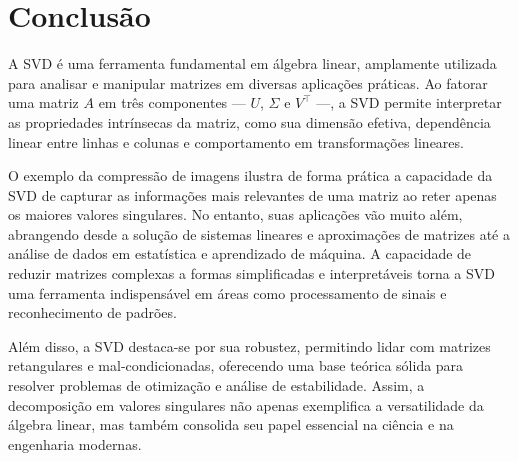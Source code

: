 \chapter{Conclusão}

A SVD é uma ferramenta fundamental em álgebra linear, amplamente utilizada para analisar e manipular matrizes em diversas aplicações práticas. Ao fatorar uma matriz \( A \) em três componentes — \( U \), \( \Sigma \) e \( V^\top \) —, a SVD permite interpretar as propriedades intrínsecas da matriz, como sua dimensão efetiva, dependência linear entre linhas e colunas e comportamento em transformações lineares. 

O exemplo da compressão de imagens ilustra de forma prática a capacidade da SVD de capturar as informações mais relevantes de uma matriz ao reter apenas os maiores valores singulares. No entanto, suas aplicações vão muito além, abrangendo desde a solução de sistemas lineares e aproximações de matrizes até a análise de dados em estatística e aprendizado de máquina. A capacidade de reduzir matrizes complexas a formas simplificadas e interpretáveis torna a SVD uma ferramenta indispensável em áreas como processamento de sinais e reconhecimento de padrões.

Além disso, a SVD destaca-se por sua robustez, permitindo lidar com matrizes retangulares e mal-condicionadas, oferecendo uma base teórica sólida para resolver problemas de otimização e análise de estabilidade. Assim, a decomposição em valores singulares não apenas exemplifica a versatilidade da álgebra linear, mas também consolida seu papel essencial na ciência e na engenharia modernas.